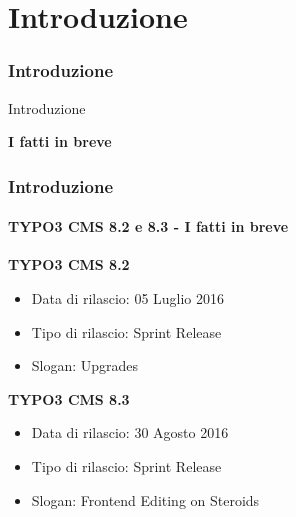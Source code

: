 %

\section{Introduzione}
\begin{frame}[fragile]
	\frametitle{Introduzione}

	\begin{center}\huge{Introduzione}\end{center}
	\begin{center}\huge{\color{typo3darkgrey}\textbf{I fatti in breve}}\end{center}

\end{frame}

\begin{frame}[fragile]
	\frametitle{Introduzione}
	\framesubtitle{TYPO3 CMS 8.2 e 8.3 - I fatti in breve}

	\textbf{TYPO3 CMS 8.2}
	\begin{itemize}
		\item Data di rilascio: 05 Luglio 2016
		\item Tipo di rilascio: Sprint Release
		\item Slogan: Upgrades
	\end{itemize}

	\vspace{0.6cm}

	\textbf{TYPO3 CMS 8.3}
	\begin{itemize}
		\item Data di rilascio: 30 Agosto 2016
		\item Tipo di rilascio: Sprint Release
		\item Slogan: Frontend Editing on Steroids
	\end{itemize}


\end{frame}

